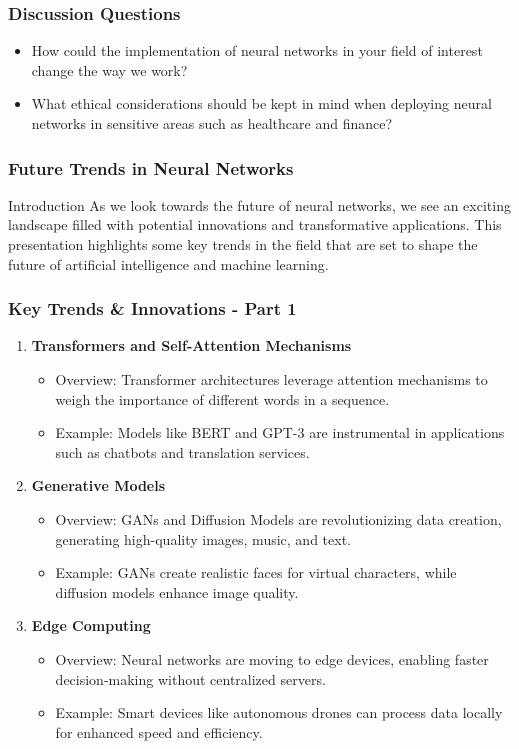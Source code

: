 \documentclass[aspectratio=169]{beamer}
\begin{document}
\begin{frame}[fragile]
    \frametitle{Discussion Questions}
    \begin{itemize}
        \item How could the implementation of neural networks in your field of interest change the way we work?
        \item What ethical considerations should be kept in mind when deploying neural networks in sensitive areas such as healthcare and finance?
    \end{itemize}
\end{frame}

\begin{frame}[fragile]
    \frametitle{Future Trends in Neural Networks}
    \begin{block}{Introduction}
        As we look towards the future of neural networks, we see an exciting landscape filled with potential innovations and transformative applications. 
        This presentation highlights some key trends in the field that are set to shape the future of artificial intelligence and machine learning.
    \end{block}
\end{frame}

\begin{frame}[fragile]
    \frametitle{Key Trends \& Innovations - Part 1}
    \begin{enumerate}
        \item \textbf{Transformers and Self-Attention Mechanisms}
        \begin{itemize}
            \item Overview: Transformer architectures leverage attention mechanisms to weigh the importance of different words in a sequence.
            \item Example: Models like BERT and GPT-3 are instrumental in applications such as chatbots and translation services.
        \end{itemize}

        \item \textbf{Generative Models}
        \begin{itemize}
            \item Overview: GANs and Diffusion Models are revolutionizing data creation, generating high-quality images, music, and text.
            \item Example: GANs create realistic faces for virtual characters, while diffusion models enhance image quality.
        \end{itemize}

        \item \textbf{Edge Computing}
        \begin{itemize}
            \item Overview: Neural networks are moving to edge devices, enabling faster decision-making without centralized servers.
            \item Example: Smart devices like autonomous drones can process data locally for enhanced speed and efficiency.
        \end{itemize}
    \end{enumerate}
\end{frame}
\end{document}
